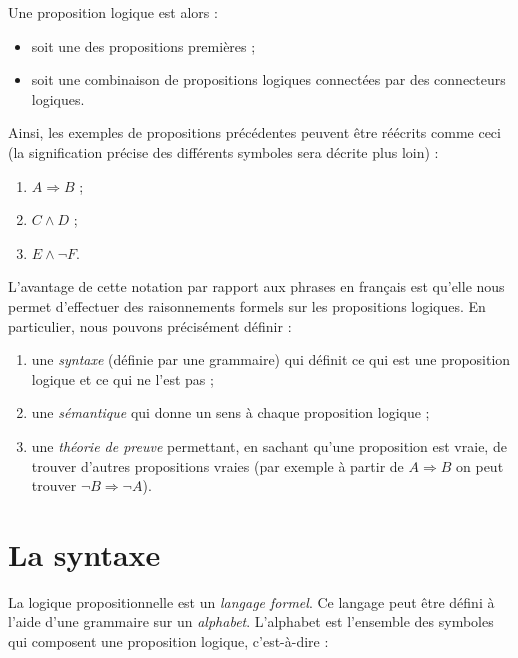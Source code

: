 Une proposition logique est alors :

\begin{itemize}
\item soit une des propositions premières ;
\item soit une combinaison de propositions logiques connectées par des
  connecteurs logiques.
\end{itemize}

Ainsi, les exemples de propositions précédentes peuvent être réécrits
comme ceci (la signification précise des différents symboles sera décrite
plus loin) :

\begin{enumerate}
\item $A \Rightarrow B$ ;
\item $C \land D$ ;
\item $E \land \lnot F$.
\end{enumerate}


L’avantage de cette notation par rapport aux phrases en français est qu’elle
nous permet d’effectuer des raisonnements formels sur les propositions
logiques. En particulier, nous pouvons précisément définir :

\begin{enumerate}
\item une \textit{syntaxe} (définie par une grammaire)
qui définit ce qui est une proposition logique et ce qui ne l’est pas ;
\item une \textit{sémantique} qui donne un sens à chaque proposition logique ;
\item une \textit{théorie de preuve} permettant, en sachant qu’une proposition est
  vraie, de trouver d’autres propositions vraies (par exemple à partir de $A
  \Rightarrow B$ on peut trouver $\lnot B \Rightarrow \lnot A$).
\end{enumerate}

\section{La syntaxe}

La logique propositionnelle est un \textit{langage formel}. Ce langage peut être défini
à l’aide d’une grammaire sur un \textit{alphabet}. L’alphabet est l’ensemble des
symboles qui composent une proposition logique, c’est-à-dire :

